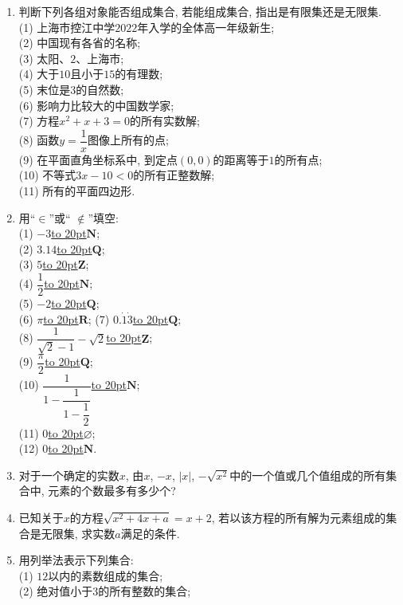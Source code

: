 \documentclass[10pt,a4paper]{article}
\newcommand{\blank}[1]{\underline{\hbox to #1pt{}}}
\begin{document}
\begin{enumerate}[1.]
\item 判断下列各组对象能否组成集合, 若能组成集合, 指出是有限集还是无限集.\\
(1) 上海市控江中学$2022$年入学的全体高一年级新生;\\
(2) 中国现有各省的名称;\\
(3) 太阳、$2$、上海市;\\
(4) 大于$10$且小于$15$的有理数;\\
(5) 末位是$3$的自然数;\\
(6) 影响力比较大的中国数学家;\\
(7) 方程$x^2+x+3=0$的所有实数解;\\ 
(8) 函数$y=\dfrac 1x$图像上所有的点;\\ 
(9) 在平面直角坐标系中, 到定点$(0, 0)$的距离等于$1$的所有点;\\
(10) 不等式$3x-10<0$的所有正整数解;\\
(11) 所有的平面四边形.
\item 用``$\in$''或`` $\notin$''填空:\\
(1) $-3$\blank{20}$\mathbf{N}$;\\
(2) $3.14$\blank{20}$\mathbf{Q}$;\\
(3) $5$\blank{20}$\mathbf{Z}$;\\
(4) $\dfrac 12$\blank{20}$\mathbf{N}$;\\
(5) $-2$\blank{20}$\mathbf{Q}$;\\
(6) $\pi$\blank{20}$\mathbf{R}$; 
(7) $0.\dot{1}\dot{3}$\blank{20}$\mathbf{Q}$;\\ 
(8) $\dfrac 1{\sqrt 2-1}-\sqrt 2$\blank{20}$\mathbf{Z}$;\\
(9) $\dfrac{\pi}2$\blank{20}$\mathbf{Q}$;\\
(10) $\dfrac 1{1-\dfrac 1{1-\dfrac 12}}$\blank{20}$\mathbf{N}$;\\
(11) $0$\blank{20}$\varnothing$;\\
(12) $0$\blank{20}$\mathbf{N}$.
\item 对于一个确定的实数$x$, 由$x$, $-x$, $|x|$, $-\sqrt{x^2}$中的一个值或几个值组成的所有集合中, 元素的个数最多有多少个? 
\item 已知关于$x$的方程$\sqrt {x^2+4x+a}=x+2$, 若以该方程的所有解为元素组成的集合是无限集, 求实数$a$满足的条件.
\item 用列举法表示下列集合:\\
(1) $12$以内的素数组成的集合;\\
(2) 绝对值小于$3$的所有整数的集合;\\

\end{enumerate}
\end{document}
